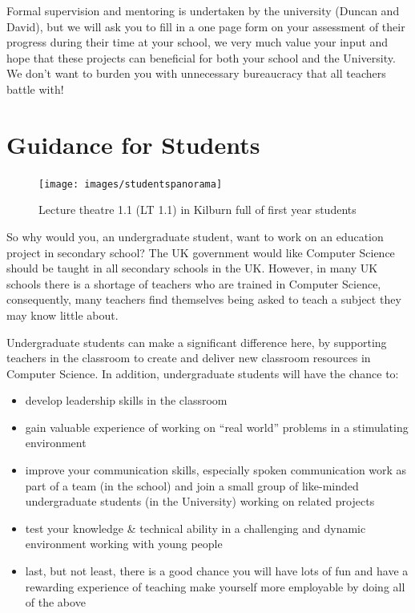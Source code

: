 \documentclass[
  12pt,
]{book}
\providecommand{\tightlist}{%
  \setlength{\itemsep}{0pt}\setlength{\parskip}{0pt}}
\begin{document}
Formal supervision and mentoring is undertaken by the university (Duncan and David), but we will ask you to fill in a one page form on your assessment of their progress during their time at your school, we very much value your input and hope that these projects can beneficial for both your school and the University. We don't want to burden you with unnecessary bureaucracy that all teachers battle with!

\hypertarget{guidance-for-students}{%
\section{Guidance for Students}\label{guidance-for-students}}

\begin{figure}

{\centering \texttt{[image: images/studentspanorama]} 

}

\caption{Lecture theatre 1.1 (LT 1.1) in Kilburn full of first year students}\label{fig:unnamed-chunk-8}
\end{figure}

So why would you, an undergraduate student, want to work on an education project in secondary school? The UK government would like Computer Science should be taught in all secondary schools in the UK. \citep{afterthereboot} However, in many UK schools there is a shortage of teachers who are trained in Computer Science, consequently, many teachers find themselves being asked to teach a subject they may know little about. \citep{shutdownrestart}

Undergraduate students can make a significant difference here, by supporting teachers in the classroom to create and deliver new classroom resources in Computer Science. \citep{computinged} In addition, undergraduate students will have the chance to:

\begin{itemize}
\tightlist
\item
  develop leadership skills in the classroom
\item
  gain valuable experience of working on ``real world'' problems in a stimulating environment
\item
  improve your communication skills, especially spoken communication
  work as part of a team (in the school) and join a small group of like-minded undergraduate students (in the University) working on related projects
\item
  test your knowledge \& technical ability in a challenging and dynamic environment working with young people
\item
  last, but not least, there is a good chance you will have lots of fun and have a rewarding experience of teaching
  make yourself more employable by doing all of the above
\end{itemize}
\end{document}
